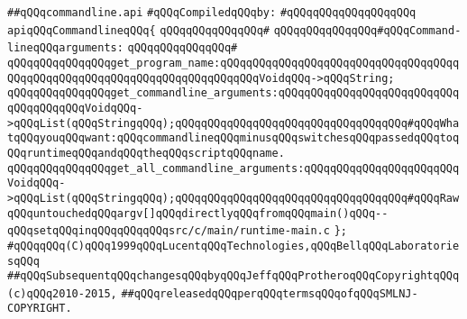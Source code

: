 \label{src/lib/std/commandline.api}
\verb|##qQQqcommandline.api|\newline
\newline
\verb|#qQQqCompiledqQQqby:|\newline
\verb|#qQQqqQQqqQQqqQQqqQQq|\newline
\newline
\verb|apiqQQqCommandlineqQQq{|\newline
\verb|qQQqqQQqqQQqqQQq#|\newline
\verb|qQQqqQQqqQQqqQQq#qQQqCommand-lineqQQqarguments:|\newline
\verb|qQQqqQQqqQQqqQQq#|\newline
\verb|qQQqqQQqqQQqqQQqget_program_name:qQQqqQQqqQQqqQQqqQQqqQQqqQQqqQQqqQQqqQQqqQQqqQQqqQQqqQQqqQQqqQQqqQQqqQQqqQQqVoidqQQq->qQQqString;|\newline
\verb|qQQqqQQqqQQqqQQqget_commandline_arguments:qQQqqQQqqQQqqQQqqQQqqQQqqQQqqQQqqQQqqQQqVoidqQQq->qQQqList(qQQqStringqQQq);qQQqqQQqqQQqqQQqqQQqqQQqqQQqqQQqqQQq#qQQqWhatqQQqyouqQQqwant:qQQqcommandlineqQQqminusqQQqswitchesqQQqpassedqQQqtoqQQqruntimeqQQqandqQQqtheqQQqscriptqQQqname.|\newline
\verb|qQQqqQQqqQQqqQQqget_all_commandline_arguments:qQQqqQQqqQQqqQQqqQQqqQQqVoidqQQq->qQQqList(qQQqStringqQQq);qQQqqQQqqQQqqQQqqQQqqQQqqQQqqQQqqQQq#qQQqRawqQQquntouchedqQQqargv[]qQQqdirectlyqQQqfromqQQqmain()qQQq--qQQqsetqQQqinqQQqqQQqqQQqsrc/c/main/runtime-main.c|\newline
\verb|};|\newline
\newline
\newline
\verb|#qQQqqQQq(C)qQQq1999qQQqLucentqQQqTechnologies,qQQqBellqQQqLaboratoriesqQQq|\newline
\verb|##qQQqSubsequentqQQqchangesqQQqbyqQQqJeffqQQqProtheroqQQqCopyrightqQQq(c)qQQq2010-2015,|\newline
\verb|##qQQqreleasedqQQqperqQQqtermsqQQqofqQQqSMLNJ-COPYRIGHT.|\newline

